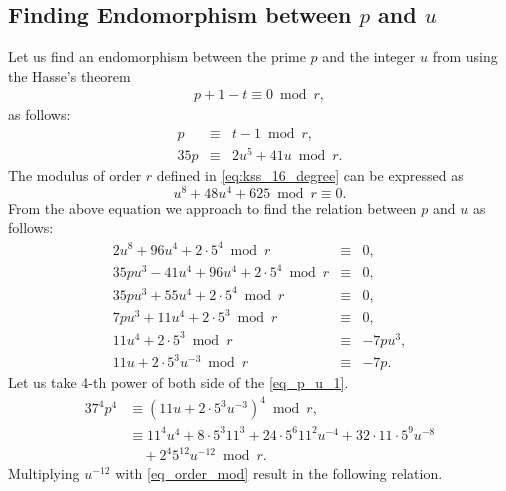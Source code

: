 \subsection{Finding  Endomorphism between \texorpdfstring{$p$}{} and \texorpdfstring{$u$}{}}
Let us find an endomorphism between the prime $p$ and the integer $u$ from using the Hasse's theorem
\begin{eqnarray}
p+1 - t \equiv 0 \bmod r, \nonumber
\end{eqnarray}
as follows:
\begin{eqnarray}
p & \equiv & t-1 \bmod r, \nonumber \\
35p   & \equiv &  2u^5+41u \bmod r. \label{eq_pt1}
\end{eqnarray}
The modulus of order $r$ defined in \eqref{eq:kss_16_degree} can be expressed as 
\begin{equation}
u^8+48u^4+625 \bmod r \equiv  0 .\label{eq_order_mod}
\end{equation}
From the above equation we approach to find the relation between $p$ and $u$ as follows:
\begin{eqnarray}
2u^8+ 96u^4 + 2 \cdot 5^4\bmod r & \equiv & 0, \nonumber \\
35pu^3-41u^4 + 96u^4 + 2 \cdot 5^4 \bmod r & \equiv & 0,\nonumber \\
35pu^3+55u^4+2\cdot5^4 \bmod r & \equiv & 0, \nonumber \\
7pu^3+11u^4+2\cdot5^3 \bmod r & \equiv & 0, \nonumber \\
11u^4+2\cdot5^3 \bmod r & \equiv & -7pu^3, \nonumber \\
11u+2\cdot5^3u^{-3} \bmod r & \equiv & -7p. \label{eq_p_u_1}
\end{eqnarray}
Let us take 4-th power of both side of the \eqref{eq_p_u_1}.
\begin{alignat}{3}
7^4p^4 &  \equiv (11u+2\cdot5^3u^{-3})^4 \bmod r, \nonumber \\
 & \equiv  11^4u^4 + 8 \cdot 5^3 11^3 + 24\cdot  5^6 11^2 u^{-4} + 32 \cdot 11 \cdot 5^9u^{-8} \nonumber \\
 &  \quad  + 2^4 5^{12}u^{-12} \bmod r. \label{eq_74p4}
\end{alignat}
Multiplying $u^{-12}$ with \eqref{eq_order_mod} result in the following relation.
